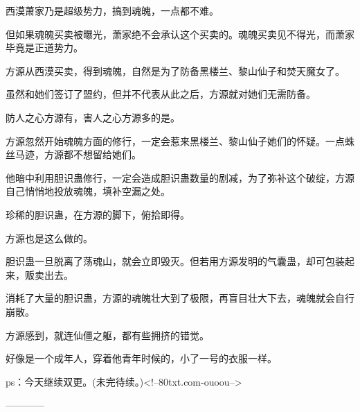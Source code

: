 \begin{this_body}
西漠萧家乃是超级势力，搞到魂魄，一点都不难。

但如果魂魄买卖被曝光，萧家绝不会承认这个买卖的。魂魄买卖见不得光，而萧家毕竟是正道势力。

方源从西漠买卖，得到魂魄，自然是为了防备黑楼兰、黎山仙子和焚天魔女了。

虽然和她们签订了盟约，但并不代表从此之后，方源就对她们无需防备。

防人之心方源有，害人之心方源多的是。

方源忽然开始魂魄方面的修行，一定会惹来黑楼兰、黎山仙子她们的怀疑。一点蛛丝马迹，方源都不想留给她们。

他暗中利用胆识蛊修行，一定会造成胆识蛊数量的剧减，为了弥补这个破绽，方源自己悄悄地投放魂魄，填补空漏之处。

珍稀的胆识蛊，在方源的脚下，俯拾即得。

方源也是这么做的。

胆识蛊一旦脱离了荡魂山，就会立即毁灭。但若用方源发明的气囊蛊，却可包装起来，贩卖出去。

消耗了大量的胆识蛊，方源的魂魄壮大到了极限，再盲目壮大下去，魂魄就会自行崩散。

方源感到，就连仙僵之躯，都有些拥挤的错觉。

好像是一个成年人，穿着他青年时候的，小了一号的衣服一样。

ps：今天继续双更。(未完待续。)<!--80txt.com-ouoou-->

------------

\end{this_body}

